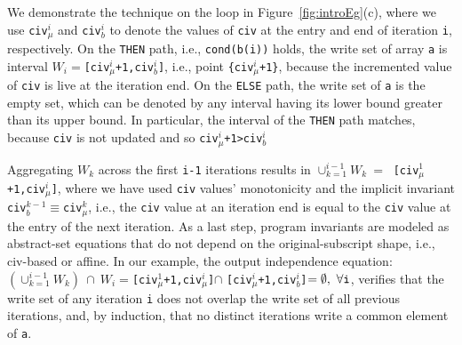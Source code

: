 \documentclass{sig-alternate}
\begin{document}
We demonstrate the technique on the loop in Figure~\ref{fig:introEg}(c),
where we use {\tt civ$_\mu^i$} and {\tt civ$_b^i$} to denote the values of 
{\tt civ} at the entry and end of iteration {\tt i}, respectively.
%
On the {\tt THEN} path, i.e., {\tt cond(b(i))} holds, the write set 
of array {\tt a} is interval $W_i=${\tt [civ$_\mu^i$+1,civ$_b^i$]}, 
i.e., point {\tt \{civ$_\mu^i$+1\}}, because the incremented value 
of {\tt civ} is live at the iteration end. 
%
On the {\tt ELSE} path, the write set of {\tt a} is the empty set,
which can be denoted by any interval having its lower bound
greater than its upper bound. In particular, the interval of the
{\tt THEN} path matches, because {\tt civ} is not updated and so
{\tt civ$_\mu^i$+1>civ$_b^i$}
%
%

Aggregating $W_k$ across the first {\tt i-1} iterations results in
$\cup_{k=1}^{i-1}W_k \ = \ $ {\tt [civ$_\mu^1$+1,civ$_\mu^i$]}, 
where we have used {\tt civ} values'
monotonicity and the implicit invariant {\tt civ$_b^{k-1}\equiv$civ$_\mu^{k}$},
i.e., the {\tt civ} value at an iteration end is equal to the {\tt civ}
value at the entry of the next iteration. 
%
%
As a last step, program invariants are modeled as abstract-set equations
that do not depend on the original-subscript shape, i.e., 
{\sc civ}-based or affine. 
%
In our example, the output independence equation:\\
$(\cup_{k=1}^{i-1}W_k)~\cap~W_i = ${\tt [civ$_\mu^1$+1,civ$_\mu^i$]}$\cap$
{\tt [civ$_\mu^i$+1,civ$_b^i$]}$ = \emptyset,~\forall \mbox{\tt{}i}$,
verifies that the write set of any iteration {\tt i} does not overlap
the write set of all previous iterations, and, by induction,
that no distinct iterations write a common element of {\tt a}.
\end{document}
